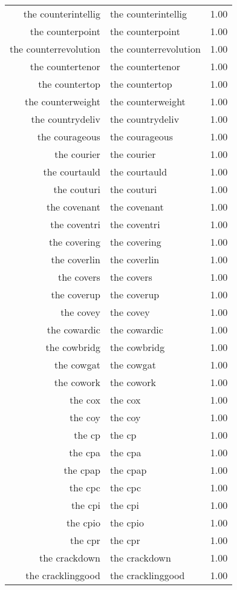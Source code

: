 \begin{table}[ht]
\begin{tabular}{rlr}
  the counterintellig & the counterintellig & 1.00 \\ 
  the counterpoint & the counterpoint & 1.00 \\ 
  the counterrevolution & the counterrevolution & 1.00 \\ 
  the countertenor & the countertenor & 1.00 \\ 
  the countertop & the countertop & 1.00 \\ 
  the counterweight & the counterweight & 1.00 \\ 
  the countrydeliv & the countrydeliv & 1.00 \\ 
  the courageous & the courageous & 1.00 \\ 
  the courier & the courier & 1.00 \\ 
  the courtauld & the courtauld & 1.00 \\ 
  the couturi & the couturi & 1.00 \\ 
  the covenant & the covenant & 1.00 \\ 
  the coventri & the coventri & 1.00 \\ 
  the covering & the covering & 1.00 \\ 
  the coverlin & the coverlin & 1.00 \\ 
  the covers & the covers & 1.00 \\ 
  the coverup & the coverup & 1.00 \\ 
  the covey & the covey & 1.00 \\ 
  the cowardic & the cowardic & 1.00 \\ 
  the cowbridg & the cowbridg & 1.00 \\ 
  the cowgat & the cowgat & 1.00 \\ 
  the cowork & the cowork & 1.00 \\ 
  the cox & the cox & 1.00 \\ 
  the coy & the coy & 1.00 \\ 
  the cp & the cp & 1.00 \\ 
  the cpa & the cpa & 1.00 \\ 
  the cpap & the cpap & 1.00 \\ 
  the cpc & the cpc & 1.00 \\ 
  the cpi & the cpi & 1.00 \\ 
  the cpio & the cpio & 1.00 \\ 
  the cpr & the cpr & 1.00 \\ 
  the crackdown & the crackdown & 1.00 \\ 
  the cracklinggood & the cracklinggood & 1.00 \\ 

\end{tabular}
\end{table}
